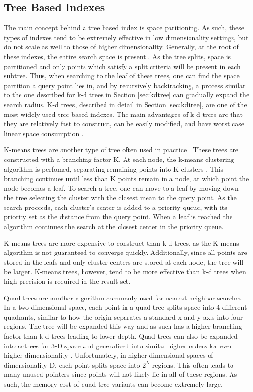 \subsection{Tree Based Indexes}
\label{sec:treeind}

The main concept behind a tree based index is space paritioning.  As such, these types of indexes tend to be extremely effective in low dimensionality settings, but do not scale as well to those of higher dimensionality.  Generally, at the root of these indexes, the entire search space is present \citep{yianilos1993data}.  As the tree splits, space is partitioned and only points which satisfy a split criteria will be present in each subtree.  Thus, when searching to the leaf of these trees, one can find the space partition a query point lies in, and by recursively backtracking, a process similar to the one described for k-d trees in Section \ref{sec:kdtree} can gradually expand the search radius.  K-d trees, described in detail in Section \ref{sec:kdtree}, are one of the most widely used tree based indexes.  The main advantages of k-d trees are that they are relatively fast to construct, can be easily modified, and have worst case linear space consumption \citep{yianilos1993data}.

K-means trees are another type of tree often used in practice \citep{flann_pami_2014}.  These trees are constructed with a branching factor K.  At each node, the k-means clustering algorithm is perfomed, separating remaining points into K clusters \citep{hartigan1979algorithm}.  This branching continues until less than K points remain in a node, at which point the node becomes a leaf.  To search a tree, one can move to a leaf by moving down the tree selecting the cluster with the closest mean to the query point.  As the search proceeds, each cluster's center is added to a priority queue, with its priority set as the distance from the query point.  When a leaf is reached the algorithm continues the search at the closest center in the priority queue.

K-means trees are more expensive to construct than k-d trees, as the K-means algorithm is not guaranteed to converge quickly.  Additionally, since all points are stored in the leafs and only cluster centers are stored at each node, the tree will be larger.  K-means trees, however, tend to be more effective than k-d trees when high precision is required in the result set.

Quad trees are another algorithm commonly used for nearest neighbor searches \citep{finkel1974quad}.  In a two dimensional space, each point in a quad tree splits space into 4 different quadrants, similar to how the origin separates a standard x and y axis into four regions.  The tree will be expanded this way and as such has a higher branching factor than k-d trees leading to lower depth.  Quad trees can also be expanded into octrees for 3-D space and generalized into similar higher orders for even higher dimensionality \citep{samet1988overview}.  Unfortunately, in higher dimensional spaces of dimensionality D, each point splits space into $2^D$ regions.  This often leads to many unused pointers since points will not likely lie in all of these regions.  As such, the memory cost of quad tree variants can become extremely large.


